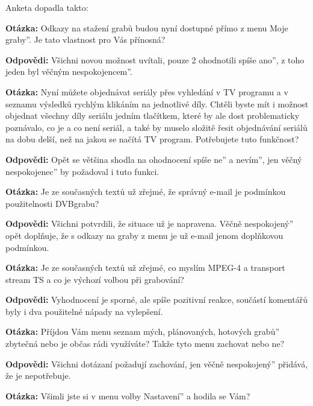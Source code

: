 \vfil
\pagebreak
Anketa dopadla takto:

\textbf{Otázka:} Odkazy na stažení grabů budou nyní dostupné přímo z menu \quotedblbase Moje graby''. Je tato vlastnost pro Vás přínosná?

\textbf{Odpovědi:} Všichni novou možnost uvítali, pouze 2 ohodnotili \quotedblbase spíše ano'', z toho jeden byl \quotedblbase věčným nespokojencem''.

\bigskip

\textbf{Otázka:} Nyní můžete objednávat seriály přes vyhledání v TV programu a v seznamu výsledků rychlým klikáním na jednotlivé díly. Chtěli byste mít i možnost objednat všechny díly seriálu jedním tlačítkem, které by ale dost problematicky poznávalo, co je a co není seriál, a také by muselo složitě řesit objednávání seriálů na dobu delší, než na jakou se načítá TV program. Potřebujete tuto funkčnost?

\textbf{Odpovědi:} Opět se většina shodla na ohodnocení \quotedblbase spíše ne'' a \quotedblbase nevím'', jen \quotedblbase věčný nespokojenec'' by požadoval i tuto funkci.

\bigskip
						
\textbf{Otázka:} Je ze současných textů už zřejmé, že správný e-mail je podmínkou použitelnosti \linebreak[4]DVBgrabu?

\textbf{Odpovědi:} Všichni potvrdili, že situace už je napravena. \quotedblbase Věčně nespokojený'' opět doplňuje, že s odkazy na graby z menu je už e-mail jenom doplňkovou podmínkou.
							
\bigskip

\textbf{Otázka:} Je ze současných textů už zřejmé, co myslím MPEG-4 a transport stream TS a co je výchozí volbou při grabování?

\textbf{Odpovědi:} Vyhodnocení je sporné, ale spíše pozitivní reakce, součástí komentářů byly i dva použitelné nápady na vylepšení.
							
\bigskip

\textbf{Otázka:} Příjdou Vám menu \quotedblbase seznam mých, plánovaných, hotových grabů'' zbytečná nebo je občas rádi využíváte? Takže tyto menu zachovat nebo ne?

\textbf{Odpovědi:} Všichni dotázaní požadují zachování, jen \quotedblbase věčně nespokojený'' přidává, že je nepotřebuje.
							
\bigskip

\textbf{Otázka:} Všimli jste si v menu volby \quotedblbase Nastavení'' a hodila se Vám?	

